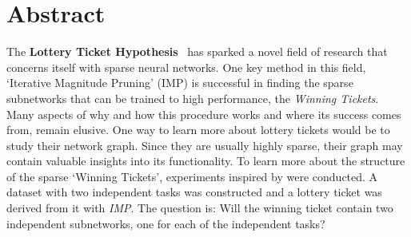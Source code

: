 \chapter*{Abstract}

The \textbf{Lottery Ticket Hypothesis}~\autocite{LTH} has sparked a novel field of research that concerns itself with sparse neural networks.
One key method in this field, `Iterative Magnitude Pruning' (IMP) is successful in finding the sparse subnetworks that can be trained to high performance, the \textit{Winning Tickets}.
Many aspects of why and how this procedure works and where its success comes from, remain elusive.
One way to learn more about lottery tickets would be to study their network graph.
Since they are usually highly sparse, their graph may contain valuable insights into its functionality.
To learn more about the structure of the sparse `Winning Tickets', experiments inspired by \textcite{BIMT} were conducted.
A dataset with two independent tasks was constructed and a lottery ticket was derived from it with \textit{IMP}.
The question is: Will the winning ticket contain two independent subnetworks, one for each of the independent tasks?